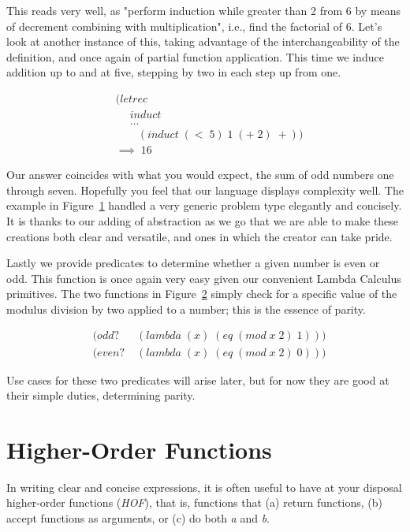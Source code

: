 This reads very well, as "perform induction while greater than 2 from 6 by means 
of decrement combining with multiplication", i.e., find the factorial of 6. Let's 
look at another instance of this, taking advantage of the interchangeability of 
the definition, and once again of partial function application. This time we 
induce addition up to and at five, stepping by two in each step up from one.

\begin{figure}[htp]
\caption{}\label{fig:inductive1to5}
\begin{align*}
& (letrec \; 
\\& \quad \; induct \; 
\\& \quad \; \dots
\\& \qquad (induct \; (< \; 5) \; 1 \; (+ \; 2) \; +))
\\& \implies \; 16
\end{align*}
\end{figure}

Our answer coincides with what you would expect, the sum of odd numbers one
through seven. Hopefully you feel that our language displays complexity well.
The example in Figure~\ref{fig:inductive1to5} handled a very generic problem
type elegantly and concisely. It is thanks to our adding of abstraction as we
go that we are able to make these creations both clear and versatile, and ones
in which the creator can take pride.

Lastly we provide predicates to determine whether a given number is even or
odd.  This function is once again very easy given our convenient Lambda
Calculus primitives. The two functions in Figure~\ref{fig:oddEvenDef} simply
check for a specific value of the modulus division by two applied to a number;
this is the essence of parity.

\begin{figure}[htp]
\caption{}\label{fig:oddEvenDef}
\begin{align*}
& (odd? \; &(lambda \; (x) \; (eq \; (mod \; x \; 2) \; 1)))
\\& (even? \; &(lambda \; (x) \; (eq \; (mod \; x \; 2) \; 0)))
\end{align*}
\end{figure}

Use cases for these two predicates will arise later, but for now they are good at 
their simple duties, determining parity.

\section{Higher-Order Functions}
In writing clear and concise expressions, it is often useful to have at your 
disposal higher-order functions (\emph{HOF}), that is, functions that (a) return 
functions, (b) accept functions as arguments, or (c) do both \emph{a} and \emph{b}.

